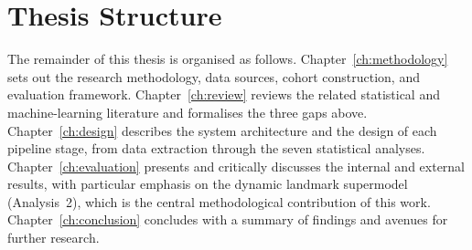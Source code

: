 \section{Thesis Structure}
The remainder of this thesis is organised as follows.
Chapter~\ref{ch:methodology} sets out the research methodology, data sources,
cohort construction, and evaluation framework.
Chapter~\ref{ch:review} reviews the related statistical and machine-learning
literature and formalises the three gaps above.
Chapter~\ref{ch:design} describes the system architecture and the design of
each pipeline stage, from data extraction through the seven statistical analyses.
Chapter~\ref{ch:evaluation} presents and critically discusses the internal and
external results, with particular emphasis on the dynamic landmark supermodel
(Analysis~2), which is the central methodological contribution of this work.
Chapter~\ref{ch:conclusion} concludes with a summary of findings and avenues
for further research.
